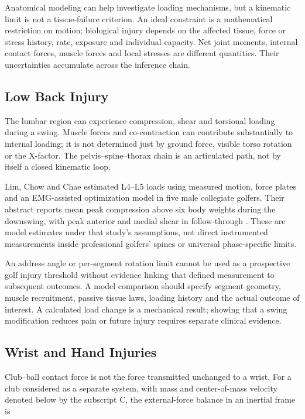 Anatomical modeling can help investigate loading mechanisms, but a kinematic limit is not a tissue-failure criterion. An ideal constraint is a mathematical restriction on motion; biological injury depends on the affected tissue, force or stress history, rate, exposure and individual capacity. Net joint moments, internal contact forces, muscle forces and local stresses are different quantities. Their uncertainties accumulate across the inference chain.

\subsection{Low Back Injury}\label{low-back-injury}

The lumbar region can experience compression, shear and torsional loading during a swing. Muscle forces and co-contraction can contribute substantially to internal loading; it is not determined just by ground force, visible torso rotation or the X-factor. The pelvis--spine--thorax chain is an articulated path, not by itself a closed kinematic loop.

Lim, Chow and Chae estimated L4--L5 loads using measured motion, force plates and an EMG-assisted optimization model in five male collegiate golfers. Their abstract reports mean peak compression above six body weights during the downswing, with peak anterior and medial shear in follow-through \citep{Lim2012LumbarLoads}. These are model estimates under that study's assumptions, not direct instrumented measurements inside professional golfers' spines or universal phase-specific limits.

An address angle or per-segment rotation limit cannot be used as a prospective golf injury threshold without evidence linking that defined measurement to subsequent outcomes. A model comparison should specify segment geometry, muscle recruitment, passive tissue laws, loading history and the actual outcome of interest. A calculated load change is a mechanical result; showing that a swing modification reduces pain or future injury requires separate clinical evidence.

\subsection{Wrist and Hand Injuries}\label{wrist-and-hand-injuries}

Club--ball contact force is not the force transmitted unchanged to a wrist. For a club considered as a separate system, with mass and center-of-mass velocity denoted below by the subscript C, the external-force balance in an inertial frame is

